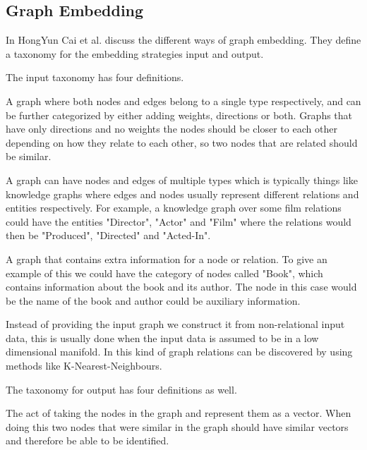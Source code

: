 \subsection{Graph Embedding}
In \cite{8294302} HongYun Cai et al. discuss the different ways of graph embedding. They define a taxonomy for the embedding strategies input and output.

The input taxonomy has four definitions.  

\begin{definition} A graph where both nodes and edges belong to a single type respectively, and can be further categorized by either adding weights, directions or both. Graphs that have only directions and no weights the nodes should be closer to each other depending on how they relate to each other, so two nodes that are related should be similar.
\end{definition}

\begin{definition} A graph can have nodes and edges of multiple types which is typically things like knowledge graphs where edges and nodes usually represent different relations and entities respectively. For example, a knowledge graph over some film relations could have the entities "Director", "Actor" and "Film" where the relations would then be "Produced", "Directed" and "Acted-In".
\end{definition}

\begin{definition} A graph that contains extra information for a node or relation. To give an example of this we could have the category of nodes called "Book", which contains information about the book and its author. The node in this case would be the name of the book and author could be auxiliary information.
\end{definition}

\begin{definition} Instead of providing the input graph we construct it from non-relational input data, this is usually done when the input data is assumed to be in a low dimensional manifold. In this kind of graph relations can be discovered by using methods like K-Nearest-Neighbours.
\end{definition}

The taxonomy for output has four definitions as well.

\begin{definition} The act of taking the nodes in the graph and represent them as a vector. When doing this two nodes that were similar in the graph should have similar vectors and therefore be able to be identified.
\end{definition}

